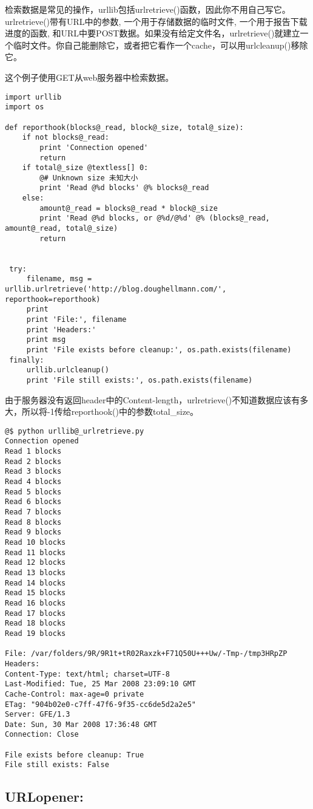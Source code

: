 \documentclass[letterpaper,10pt,english]{manual}
\begin{document}
检索数据是常见的操作，urllib包括urlretrieve()函数，因此你不用自己写它。urlretrieve()带有URL中的参数, 一个用于存储数据的临时文件, 一个用于报告下载进度的函数, 和URL中要POST数据。如果没有给定文件名，urlretrieve()就建立一个临时文件。你自己能删除它，或者把它看作一个cache，可以用urlcleanup()移除它。

这个例子使用GET从web服务器中检索数据。

\begin{Verbatim}[commandchars=@\[\]]
import urllib
import os

def reporthook(blocks@_read, block@_size, total@_size):
    if not blocks@_read:
        print 'Connection opened'
        return
    if total@_size @textless[] 0:
        @# Unknown size 未知大小
        print 'Read @%d blocks' @% blocks@_read
    else:
        amount@_read = blocks@_read * block@_size
        print 'Read @%d blocks, or @%d/@%d' @% (blocks@_read, amount@_read, total@_size)
        return


 try:
     filename, msg = urllib.urlretrieve('http://blog.doughellmann.com/', reporthook=reporthook)
     print
     print 'File:', filename
     print 'Headers:'
     print msg
     print 'File exists before cleanup:', os.path.exists(filename)
 finally:
     urllib.urlcleanup()
     print 'File still exists:', os.path.exists(filename)
\end{Verbatim}

由于服务器没有返回header中的Content-length，urlretrieve()不知道数据应该有多大，所以将-1传给reporthook()中的参数total\_size。

\begin{Verbatim}[commandchars=@\[\]]
@$ python urllib@_urlretrieve.py
Connection opened
Read 1 blocks
Read 2 blocks
Read 3 blocks
Read 4 blocks
Read 5 blocks
Read 6 blocks
Read 7 blocks
Read 8 blocks
Read 9 blocks
Read 10 blocks
Read 11 blocks
Read 12 blocks
Read 13 blocks
Read 14 blocks
Read 15 blocks
Read 16 blocks
Read 17 blocks
Read 18 blocks
Read 19 blocks

File: /var/folders/9R/9R1t+tR02Raxzk+F71Q50U+++Uw/-Tmp-/tmp3HRpZP
Headers:
Content-Type: text/html; charset=UTF-8
Last-Modified: Tue, 25 Mar 2008 23:09:10 GMT
Cache-Control: max-age=0 private
ETag: "904b02e0-c7ff-47f6-9f35-cc6de5d2a2e5"
Server: GFE/1.3
Date: Sun, 30 Mar 2008 17:36:48 GMT
Connection: Close

File exists before cleanup: True
File still exists: False
\end{Verbatim}


\subsection{URLopener:}
\end{document}
